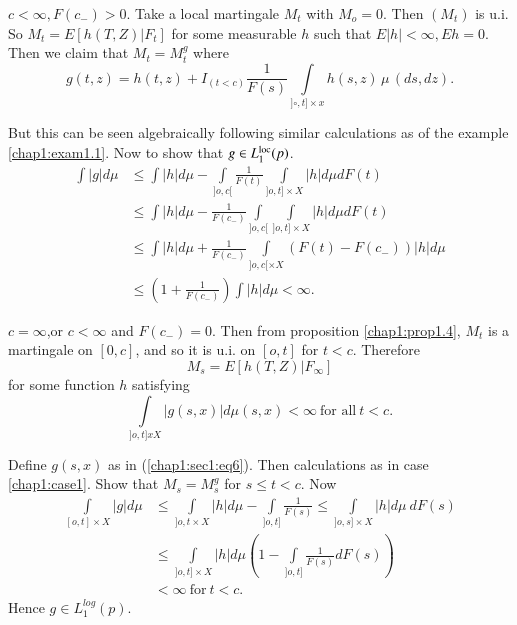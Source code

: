 \setcounter{proofofprop}{6}
\begin{proofofprop}%
  \begin{case}\label{chap1:case1}%
    $c < \infty, F(c_-) > 0$. Take a local martingale $M_t$ with $M_o =
    0$. Then $(M_t)$ is u.i. So $M_t = E[h (T,Z) | F_t]$ for some
    measurable $h$ such that $E|h| < \infty, E h = 0$. Then we claim
    that $M_t = M^g_t$ where 	 
    $$ 
    g(t,z) = h(t,z) + I_{(t < c)} \frac{1}{F(s)} \int \limits_{]\circ, t]
      \times x} h(s,z)\, \mu\, (ds, dz). 
        $$ 
  \end{case}
  
  But this can be seen algebraically following similar calculations as
  of the example \ref{chap1:exam1.1}. Now to show that $g \in  L^{\operatorname{loc}}_1
  (p)$. 
  \begin{align*}
    \int |g| d \mu & \le \int |h| d \mu - \int \limits_{]o, c [}
    \frac{1}{F(t)} \int \limits_{]o, t]\times X} |h|d \mu dF(t) \\ 
        & \le \int |h| d \mu - \frac{1}{F(c_-)} \int \limits_{]o, c [}
        \int \limits_{]o, t] \times X} |h|d \mu d F(t) \\ 
        & \le \int |h| d \mu + \frac{1}{F(c_-)} \int \limits_{]o, c
             [\times X} (F(t) - F(c_-)) |h| d \mu \\ 
        & \le \left(1 + \frac{1}{F(c_-)}\right) \int |h| d \mu <
             \infty. 
  \end{align*} 

  \begin{case}%
    $c = \infty$,\pageoriginale or $c < \infty$ and $F(c_-) = 0$. Then from
    proposition \ref{chap1:prop1.4}, $M_t$ is a martingale on $[ 0, c
    ]$, and so it 
        is u.i. on $[o,t]$ for $t < c$. Therefore 
        $$
        M_s = E[h (T,Z) | F_\infty]
        $$
        for some function $h$ satisfying 
   $$
        \int \limits_{] o, t ]x X}| g(s,x)| d \mu (s,x) < \infty
    ~\text{for all}~ t < c. 
    $$

    Define $g(s,x)$ as in (\ref{chap1:sec1:eq6}). Then calculations as in case
    \ref{chap1:case1}. Show that $M_s = M^g_s$ for $s \le t < c$. Now 
    \begin{align*}
      \int \limits_{[o,t ] \times X} |g|d\mu & \le \int \limits_{]o,t
      \times X} |h|d\mu -  \int \limits_{]o,t]} \frac{1}{F(s)}  \le
            \int \limits_{]o,s] \times X}|h|d\mu ~ dF(s)\\ 
                & \le \int \limits_{]o,t] \times X}|h|d\mu (1 - \int
                    \limits_{]o,t]} \frac{1}{F(s)} dF(s))\\  
                        & < \infty ~\text{for}~ t < c.
    \end{align*}
    Hence $g \in  L^{log}_1 (p)$.
  \end{case}
\end{proofofprop}

